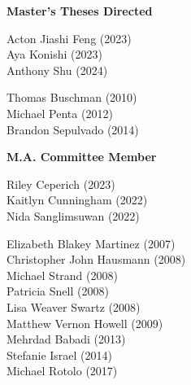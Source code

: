 
\noindent \textbf{Master's Theses Directed}

    \begin{multicols}{2}
    \noindent
    Acton Jiashi Feng (2023) \\
    Aya Konishi (2023)  \\ 	
    Anthony Shu (2024)
\end{multicols}

    \begin{multicols}{2}
    \noindent
    Thomas Buschman (2010) \\
    Michael Penta (2012)  \\ 	
    Brandon Sepulvado (2014)
\end{multicols}
\newpage
\noindent \textbf{M.A. Committee Member}  

\begin{multicols}{2}
    \noindent
    Riley Ceperich (2023) \\
    Kaitlyn Cunningham (2022) \\
    Nida Sanglimsuwan (2022) 
\end{multicols}

\medskip
{}
\begin{multicols}{2}
    \noindent
    Elizabeth Blakey Martinez (2007) \\
    Christopher John Hausmann (2008) \\
    Michael Strand (2008) \\
    Patricia Snell (2008) \\
    Lisa Weaver Swartz (2008) \\
    Matthew Vernon Howell (2009) \\
    Mehrdad Babadi (2013) \\
    Stefanie Israel (2014) \\
    Michael Rotolo (2017)
\end{multicols}